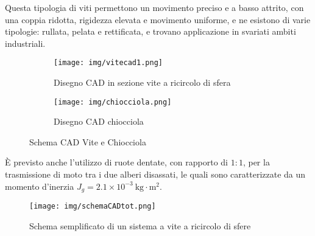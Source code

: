 \documentclass{article}
\begin{document}
Questa tipologia di viti permettono un movimento preciso e a basso attrito, con una coppia ridotta, rigidezza elevata e movimento uniforme, e ne esistono di varie tipologie: rullata, pelata e rettificata,  e trovano applicazione in svariati ambiti industriali.

\begin{figure}[h!]
    \centering
    \begin{subfigure}{0.45\textwidth}
        \centering
        \texttt{[image: img/vitecad1.png]}
        \caption{ Disegno CAD in sezione vite a ricircolo di sfera}
        \label{fig:vite1}
    \end{subfigure}
    \hspace{0.05\textwidth}
    \begin{subfigure}{0.45\textwidth}
        \centering
        \texttt{[image: img/chiocciola.png]}
        \caption{Disegno CAD chiocciola}
        \label{fig:chiocciola1}
    \end{subfigure}
    \caption{Schema CAD Vite e Chiocciola}
    \label{fig:schemavitechiocciola1}
\end{figure}
È previsto anche l'utilizzo di ruote dentate, con rapporto di $1:1$, per la trasmissione di moto tra i due alberi disassati, le quali sono caratterizzate da un momento d’inerzia \( J_g = 2.1 \times 10^{-3} \ \mathrm{kg \cdot m^2} \).
\begin{figure}[h!]
    \centering
    \texttt{[image: img/schemaCADtot.png]}
    \caption{Schema semplificato di un sistema a vite a ricircolo di sfere}
    \label{fig: schemacad1}
\end{figure}
\end{document}
